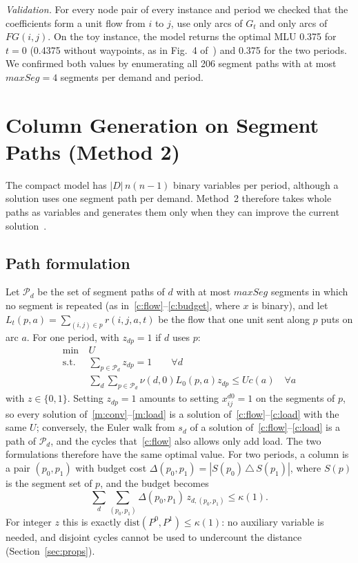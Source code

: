 \documentclass[conference]{IEEEtran}
\begin{document}
\emph{Validation.} For every node pair of every instance and period we checked that the coefficients form a unit flow from $i$ to $j$, use only arcs of $G_t$ and only arcs of $FG(i,j)$. On the toy instance, the model returns the optimal MLU 0.375 for $t=0$ (0.4375 without waypoints, as in Fig.~4 of~\cite{subject}) and 0.375 for the two periods. We confirmed both values by enumerating all 206 segment paths with at most $maxSeg=4$ segments per demand and period.

\section{Column Generation on Segment Paths (Method 2)}\label{sec:cg}

The compact model has $|D|\,n(n-1)$ binary variables per period, although a solution uses one segment path per demand. Method~2 therefore takes whole paths as variables and generates them only when they can improve the current solution~\cite{cg4sr,jaumard2026}.

\subsection{Path formulation}
Let $\mathcal P_d$ be the set of segment paths of $d$ with at most $maxSeg$ segments in which no segment is repeated (as in~\eqref{c:flow}--\eqref{c:budget}, where $x$ is binary), and let $L_t(p,a)=\sum_{(i,j)\in p}r(i,j,a,t)$ be the flow that one unit sent along $p$ puts on arc $a$. For one period, with $z_{dp}=1$ if $d$ uses $p$:
\begin{align}
\min\ & U\nonumber\\
\text{s.t. } & \textstyle\sum_{p\in\mathcal P_d}z_{dp}=1 \qquad \forall d \label{m:conv}\\
& \textstyle\sum_d\sum_{p\in\mathcal P_d}\nu(d,0)L_0(p,a)z_{dp}\le U c(a)\quad \forall a \label{m:load}
\end{align}
with $z\in\{0,1\}$. Setting $z_{dp}=1$ amounts to setting $x^{d0}_{ij}=1$ on the segments of $p$, so every solution of~\eqref{m:conv}--\eqref{m:load} is a solution of~\eqref{c:flow}--\eqref{c:load} with the same $U$; conversely, the Euler walk from $s_d$ of a solution of~\eqref{c:flow}--\eqref{c:load} is a path of $\mathcal P_d$, and the cycles that~\eqref{c:flow} also allows only add load. The two formulations therefore have the same optimal value. For two periods, a column is a pair $(p_0,p_1)$ with budget cost $\Delta(p_0,p_1)=|S(p_0)\,\triangle\,S(p_1)|$, where $S(p)$ is the segment set of $p$, and the budget becomes
\begin{equation}
\textstyle\sum_d\sum_{(p_0,p_1)}\Delta(p_0,p_1)\,z_{d,(p_0,p_1)}\le\kappa(1).\label{m:budget}
\end{equation}
For integer $z$ this is exactly $\mathrm{dist}(P^0,P^1)\le\kappa(1)$: no auxiliary variable is needed, and disjoint cycles cannot be used to undercount the distance (Section~\ref{sec:props}).
\end{document}
